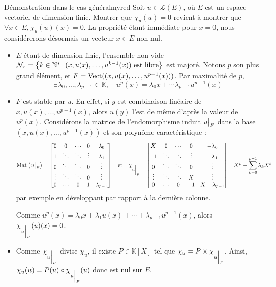     \begin{demo}{Démonstration dans le cas général}{myred}
        Soit $u \in \mathcal{L}(E)$, où $E$ est un espace vectoriel de dimension finie. Montrer que $\chi_u(u) = 0$ revient à montrer que $\forall x \in E, \chi_u(u)(x) = 0$. La propriété étant immédiate pour $x = 0$, nous considérerons désormais un vecteur $x \in E$ non nul.
        \begin{itemize}
            \item $E$ étant de dimension finie, l’ensemble non vide $\mathcal{N}_x = \left\{k \in \mathbb{N}^* \, \middle| \, (x,u(x), \ldots, u^{k-1}(x)) \text{ est libre}\right\}$ est majoré. Notons $p$ son plus grand élément, et $F = \operatorname{Vect}((x,u(x), \ldots, u^{p-1}(x)))$. Par maximalité de $p$, 
            \[ \exists \lambda_0,\ldots, \lambda_{p-1} \in \mathbb{K}, \quad u^p(x) = \lambda_0 x + \cdots \lambda_{p-1} u^{p-1}(x) \]   
            \item $F$ est stable par $u$. En effet, si $y$ est combinaison linéaire de $x,u(x), \ldots, u^{p-1}(x)$, alors $u(y)$ l’est de même d’après la valeur de $u^p(x)$. Considérons la matrice de l’endomorphisme induit $\restr{u}{F}$ dans la base $(x, u(x), \ldots, u^{p-1}(x))$ et son polynôme caractéristique :
            \[ \mat{}{\restr{u}{F}} = \begin{bmatrix}
                0 & 0 & \cdots & 0 & \lambda_0 \\
                1 & \ddots & \ddots & \vdots & \lambda_1 \\
                0 & \ddots & \ddots & 0 & \vdots \\
                \vdots & \ddots & \ddots & 0 & \vdots \\
                0 & \cdots & 0 & 1 & \lambda_{p-1}
            \end{bmatrix} \esp{et} \chi_{\restr{u}{F}} = \begin{vmatrix}
                X & 0 & \cdots & 0 & -\lambda_0 \\
                - 1 & \ddots & \ddots & \vdots & -\lambda_1 \\
                0 & \ddots & \ddots & 0 & \vdots \\
                \vdots & \ddots & \ddots & X & \vdots \\
                0 & \cdots & 0 & - 1 & X - \lambda_{p-1}
            \end{vmatrix} = X^p - \sum_{k=0}^{p-1} \lambda_k X^k \]   
            par exemple en développant par rapport à la dernière colonne.
            
            Comme $u^p(x) = \lambda_0 x + \lambda_1 u(x) + \cdots + \lambda_{p-1} u^{p-1}(x)$, alors $\chi_{\restr{u}{F}}(u)(x) = 0$.
            \item Comme $\chi_{\restr{u}{F}}$ divise $\chi_u$, il existe $P \in \mathbb{K}[X]$ tel que $\chi_{u} = P \times \chi_{\restr{u}{F}}$. Ainsi, $\chi_u(u) = P(u) \circ \chi_{\restr{u}{F}}(u)$ donc est nul sur $E$.
        \end{itemize}
    \end{demo}

